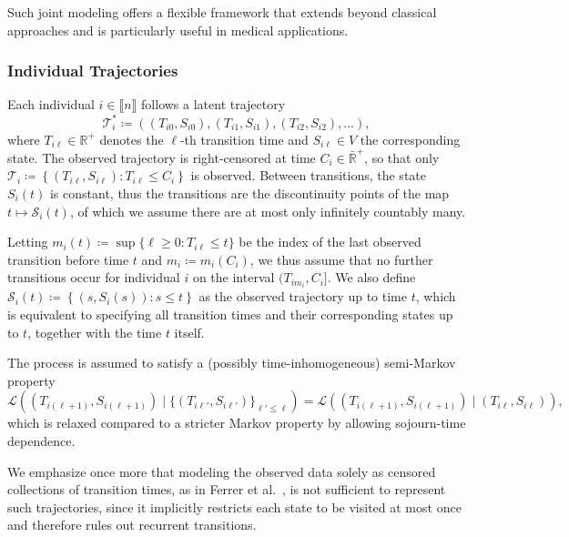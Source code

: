 \documentclass{sn-jnl}
\begin{document}
Such joint modeling offers a flexible framework that extends beyond classical approaches and is particularly useful in medical applications.

\subsubsection{Individual Trajectories}

Each individual $i \in \llbracket n \rrbracket$ follows a latent trajectory
\[
    \mathcal{T}_i^* \coloneqq \left( (T_{i0}, S_{i0}), (T_{i1}, S_{i1}), (T_{i2}, S_{i2}), \dots \right),
\]
where $T_{i\ell} \in \mathbb{R}^+$ denotes the $\ell$-th transition time and
$S_{i\ell} \in V$ the corresponding state. The observed trajectory is right-censored at time $C_i \in \bar{\mathbb{R}}^+$, so that only $\mathcal{T}_i \coloneqq \left\{ (T_{i\ell}, S_{i\ell}) : T_{i\ell} \leq C_i \right\}$ is observed. Between transitions, the state $S_i(t)$ is constant, thus the transitions are the discontinuity points of the map $t \mapsto \mathcal{S}_i(t)$, of which we assume there are at most only infinitely countably many.

Letting $m_i(t) \coloneqq \sup \{ \ell \geq 0 : T_{i\ell} \leq t \}$ be the index of the last observed transition before time $t$ and $m_i \coloneqq m_i(C_i)$, we thus assume that no further transitions occur for individual $i$ on the interval $(T_{im_i}, C_i]$. We also define $\mathcal{S}_i(t) \coloneqq \left\{ (s, S_i(s)) : s \leq t \right\}$ as the observed trajectory up to time $t$, which is equivalent to specifying all transition times and their corresponding states up to $t$, together with the time $t$ itself.

The process is assumed to satisfy a (possibly time-inhomogeneous) semi-Markov property
\begin{equation} \label{ass:semi-markov}
    \mathscr{L} \left( (T_{i(\ell+1)}, S_{i(\ell+1)}) \mid \{(T_{i\ell'}, S_{i\ell'})\}_{\ell' \leq \ell} \right) = \mathscr{L} \left( (T_{i(\ell+1)}, S_{i(\ell+1)}) \mid (T_{i\ell}, S_{i\ell}) \right),
\end{equation}
which is relaxed compared to a stricter Markov property by allowing sojourn-time dependence.

\bigbreak

We emphasize once more that modeling the observed data solely as censored collections of transition times, as in Ferrer et al.~\citep{ferrer2016joint}, is not sufficient to represent such trajectories, since it implicitly restricts each state to be visited at most once and therefore rules out recurrent transitions.
\end{document}
